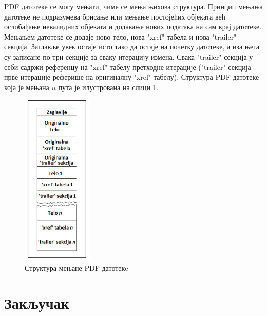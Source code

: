\documentclass[12pt,oneside]{memoir}
\begin{document}
PDF датотеке се могу мењати, чиме се мења њихова структура. Принцип мењања датотеке не подразумева брисање или мењање постојећих објеката већ ослобађање невалидних објеката и додавање нових података на сам крај датотеке. Мењањем датотеке се додаје ново тело, нова "xref" табела и нова "trailer" секција. Заглавље увек остаје исто тако да остаје на почетку датотеке, а иза њега су записане по три секције за сваку итерацију измена. Свака "trailer" секција у себи садржи референцу на "xref" табелу претходне итерације ("trailer" секција прве итерације реферише на оригиналну "xref" табелу). Структура PDF датотеке која је мењана \textit{$n$} пута је илустрована на слици \ref{fig:pdfStruktura2}.

\begin{figure}[t!]
\centering
\includegraphics[width=0.3\textwidth]{pdfStruktura2.png}
\caption{Структура мењане PDF датотекe}
\label{fig:pdfStruktura2}
\end{figure}


\chapter{Закључак}

\literatura
\end{document}
